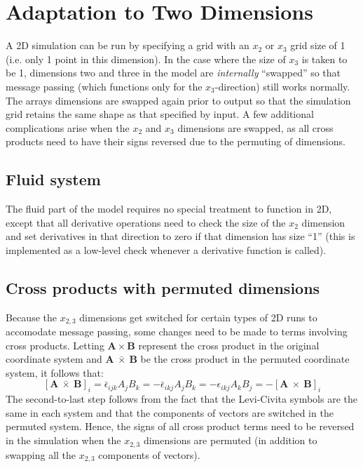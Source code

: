 \documentclass[11pt,letterpaper]{article}
\begin{document}
\section{Adaptation to Two Dimensions} \label{sec:2D}

A 2D simulation can be run by specifying a grid with an $x_2$ or $x_3$ grid size of 1 (i.e. only 1 point in this dimension).  In the case where the size of $x_3$ is taken to be 1, dimensions two and three in the model are \emph{internally} ``swapped'' so that message passing (which functions only for the $x_3$-direction) still works normally.  The arrays dimensions are swapped again prior to output so that the simulation grid retains the same shape as that specified by input.  A few additional complications arise when the $x_2$ and $x_3$ dimensions are swapped, as all cross products need to have their signs reversed due to the permuting of dimensions.  


\subsection{Fluid system}

The fluid part of the model requires no special treatment to function in 2D, except that all derivative operations need to check the size of the $x_2$ dimension and set derivatives in that direction to zero if that dimension has size ``1'' (this is implemented as a low-level check whenever a derivative function is called).  


\subsection{Cross products with permuted dimensions}

Because the $x_{2,3}$ dimensions get switched for certain types of 2D runs to accomodate message passing, some changes need to be made to terms involving cross products.  Letting $\mathbf{A} \times \mathbf{B}$ represent the cross product in the original coordinate system and $\mathbf{A}~\bar{\times}~\mathbf{B}$ be the cross product in the permuted coordinate system, it follows that:
\begin{equation}
\left[ \mathbf{A}~\bar{\times}~\mathbf{B} \right]_i = \bar{\epsilon}_{ijk} A_j B_k = - \bar{\epsilon}_{ikj} A_j B_k = - \epsilon_{ikj} A_k B_j = - \left[ \mathbf{A}~\times~\mathbf{B} \right]_i
\end{equation}
The second-to-last step follows from the fact that the Levi-Civita symbols are the same in each system and that the components of vectors are switched in the permuted system.  Hence, the signs of all cross product terms need to be reversed in the simulation when the $x_{2,3}$ dimensions are permuted (in addition to swapping all the $x_{2,3}$ components of vectors).  
\end{document}
